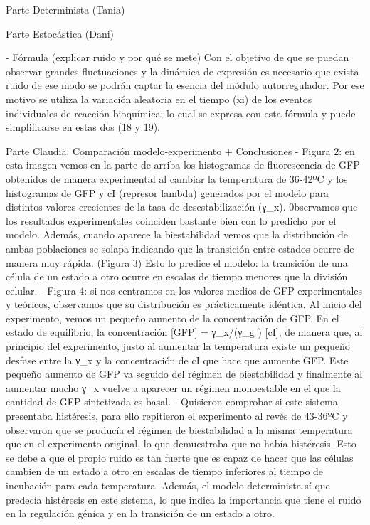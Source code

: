 Parte Determinista (Tania)


Parte Estocástica (Dani)

- Fórmula (explicar ruido y por qué se mete)
Con el objetivo de que se puedan observar grandes fluctuaciones y la dinámica de expresión es necesario que exista ruido de ese modo se podrán captar la esencia del módulo autorregulador.
Por ese motivo se utiliza la variación aleatoria en el tiempo (xi) de los eventos individuales de reacción bioquímica; lo cual se expresa con esta fórmula y puede simplificarse en estas dos (18 y 19).



Parte Claudia: Comparación modelo-experimento + Conclusiones
- Figura 2: en esta imagen vemos en la parte de arriba los histogramas de fluorescencia de GFP obtenidos de manera experimental al cambiar la temperatura de 36-42ºC y los histogramas de GFP y cI (represor lambda) generados por el modelo para distintos valores crecientes de la tasa de desestabilización (γ_x). 0bservamos que los resultados experimentales coinciden bastante bien con lo predicho por el modelo. Además, cuando aparece la biestabilidad vemos que la distribución de ambas poblaciones se solapa indicando que la transición entre estados ocurre de manera muy rápida. (Figura 3) Esto lo predice el modelo: la transición de una célula de un estado a otro ocurre en escalas de tiempo menores que la división celular.
- Figura 4: si nos centramos en los valores medios de GFP experimentales y teóricos, observamos que su distribución es prácticamente idéntica. Al inicio del experimento, vemos un pequeño aumento de la concentración de GFP. En el estado de equilibrio, la concentración [GFP] =  γ_x/(γ_g  ) [cI], de manera que, al principio del experimento, justo al aumentar la temperatura existe un pequeño desfase entre la γ_x y la concentración de cI que hace que aumente GFP. Este pequeño aumento de GFP va seguido del régimen de biestabilidad y finalmente al aumentar mucho  γ_x vuelve a aparecer un régimen monoestable en el que la cantidad de GFP sintetizada es basal.
- Quisieron comprobar si este sistema presentaba histéresis, para ello repitieron el experimento al revés de 43-36ºC y observaron que se producía el régimen de biestabilidad a la misma temperatura que en el experimento original, lo que demuestraba que no había histéresis. Esto se debe a que el propio ruido es tan fuerte que es capaz de hacer que las células cambien de un estado a otro en escalas de tiempo inferiores al tiempo de incubación para cada temperatura. Además, el modelo determinista sí que predecía histéresis en este sistema, lo que indica la importancia que tiene el ruido en la regulación génica y en la transición de un estado a otro.

